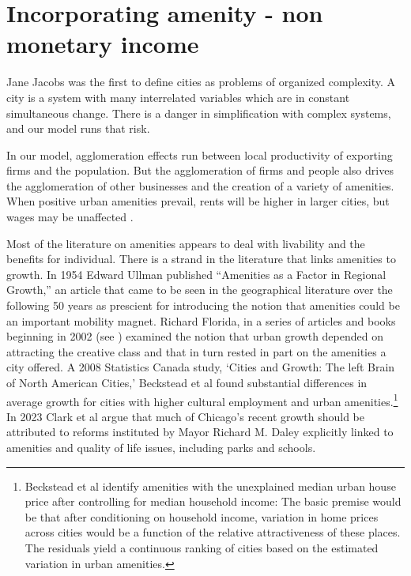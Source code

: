 \chapter[Amenity]{Incorporating amenity - non monetary income}\label{appendix-amenity}



Jane Jacobs was the first to define cities as problems of organized complexity. A city is a system with many interrelated variables which are  in constant simultaneous change. 
There is a danger in simplification with complex systems, and our model runs that risk. 

In our model, agglomeration effects run between local productivity  of exporting firms and the population. But the agglomeration of firms and people also drives the agglomeration of other businesses and the creation of a variety of amenities. When positive urban amenities prevail, rents will be higher in larger cities, but wages may be unaffected \cite{robackWagesRentsAmenities1988, dalmazzoAmenitiesSkillbiasedAgglomeration2011}.



Most of the literature on amenities appears to deal with livability  and the benefits for individual. There is a strand in the literature that links amenities to  growth. In 1954  
Edward Ullman \cite{ullmanAmenitiesFactorRegional1954} published  ``Amenities as a Factor in Regional Growth,'' an article that came to be seen in the geographical literature over the following 50 years as prescient \cite{walcottCommentsEdwardUllman2010} for introducing  the notion that amenities could be an important mobility magnet. Richard Florida, in a series of articles and books beginning in 2002 (see \cite{floridaCreativeClassEconomic2014}) examined the notion that urban growth depended on attracting  the creative class and that in turn rested in part on the amenities a city offered. 
A 2008  Statistics Canada study, `Cities and Growth: The left Brain of North American Cities,' Beckstead et al  \cite{becksteadCitiesGrowthLeft2008} found substantial differences in average growth for cities with higher cultural employment and urban amenities.\footnote{Beckstead et al identify amenities with the unexplained median urban house price after controlling for median household income:  The basic premise would be that after conditioning on household income, variation in home prices across cities would be a function of the relative attractiveness of these places. 
The residuals  yield a continuous ranking of cities based on the estimated variation in urban amenities.} In 2023 Clark et al \cite{clarkAmenitiesDriveUrban2002} argue that much of Chicago's recent growth  should be attributed to reforms instituted by Mayor Richard M.  Daley  explicitly linked to amenities and quality of life issues, including parks and schools.

